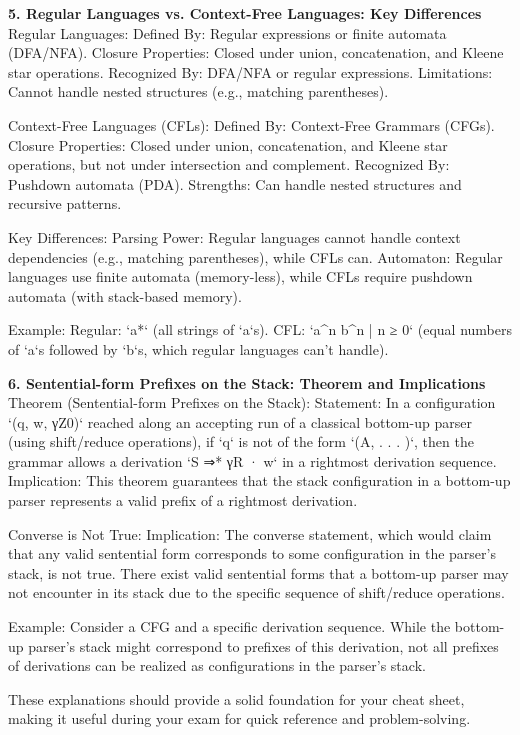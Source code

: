\textbf{5. Regular Languages vs. Context-Free Languages: Key Differences}
Regular Languages:
  Defined By: Regular expressions or finite automata (DFA/NFA).
  Closure Properties: Closed under union, concatenation, and Kleene star operations.
  Recognized By: DFA/NFA or regular expressions.
  Limitations: Cannot handle nested structures (e.g., matching parentheses).

Context-Free Languages (CFLs):
  Defined By: Context-Free Grammars (CFGs).
  Closure Properties: Closed under union, concatenation, and Kleene star operations, but not under intersection and complement.
  Recognized By: Pushdown automata (PDA).
  Strengths: Can handle nested structures and recursive patterns.

Key Differences:
Parsing Power: Regular languages cannot handle context dependencies (e.g., matching parentheses), while CFLs can.
Automaton: Regular languages use finite automata (memory-less), while CFLs require pushdown automata (with stack-based memory).

Example:
Regular: `a*` (all strings of `a`s).
CFL: `{a^n b^n | n ≥ 0}` (equal numbers of `a`s followed by `b`s, which regular languages can't handle).


\textbf{6. Sentential-form Prefixes on the Stack: Theorem and Implications}
Theorem (Sentential-form Prefixes on the Stack):
  Statement: In a configuration `(q, w, γZ0)` reached along an accepting run of a classical bottom-up parser (using shift/reduce operations), if `q` is not of the form `(A, . . . )`, then the grammar allows a derivation `S ⇒* γR · w` in a rightmost derivation sequence.
  Implication: This theorem guarantees that the stack configuration in a bottom-up parser represents a valid prefix of a rightmost derivation.

Converse is Not True:
  Implication: The converse statement, which would claim that any valid sentential form corresponds to some configuration in the parser's stack, is not true. There exist valid sentential forms that a bottom-up parser may not encounter in its stack due to the specific sequence of shift/reduce operations.

Example:
Consider a CFG and a specific derivation sequence. While the bottom-up parser’s stack might correspond to prefixes of this derivation, not all prefixes of derivations can be realized as configurations in the parser’s stack.


These explanations should provide a solid foundation for your cheat sheet, making it useful during your exam for quick reference and problem-solving.
